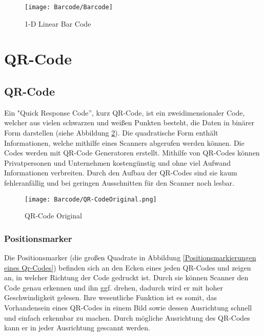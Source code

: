 \begin{figure}
    \begin{center}
        \texttt{[image: Barcode/Barcode]}
        \caption{1-D Linear Bar Code}\label{fig:Bar code}
    \end{center}
\end{figure}


\section{QR-Code}

\subsection{QR-Code} 

{Ein "Quick Response Code”, kurz QR-Code, ist ein zweidimensionaler Code, welcher aus vielen schwarzen und weißen Punkten besteht, die Daten in binärer Form darstellen (siehe Abbildung \ref{QR-Code Original}). Die quadratische Form enthält Informationen, welche mithilfe eines Scanners abgerufen werden können. Die Codes werden mit QR-Code Generatoren erstellt. Mithilfe von QR-Codes können Privatpersonen und Unternehmen kostengünstig und ohne viel Aufwand Informationen verbreiten. Durch den Aufbau der QR-Codes sind sie kaum fehleranfällig und bei geringen Ausschnitten für den Scanner noch lesbar.
} 

\begin{figure}
    \centering
    \texttt{[image: Barcode/QR-CodeOriginal.png]}
    \caption{QR-Code Original }
    \label{QR-Code Original}
\end{figure}



\subsubsection{Positionsmarker}

{Die Positionsmarker (die großen Quadrate in Abbildung \ref{Positionsmarkierungen eines Qr-Codes}) befinden sich an den Ecken eines jeden QR-Codes und zeigen an, in welcher Richtung der Code gedruckt ist. 
    Durch sie können Scanner den Code genau erkennen und ihn ggf. drehen, dadurch wird er mit hoher Geschwindigkeit gelesen. Ihre wesentliche Funktion ist es somit, das Vorhandensein eines QR-Codes in einem Bild sowie dessen Ausrichtung schnell und einfach erkennbar zu machen.
    Durch mögliche Ausrichtung des QR-Codes kann er in jeder Ausrichtung gescannt werden. \cite{Mishra:2017}
}

